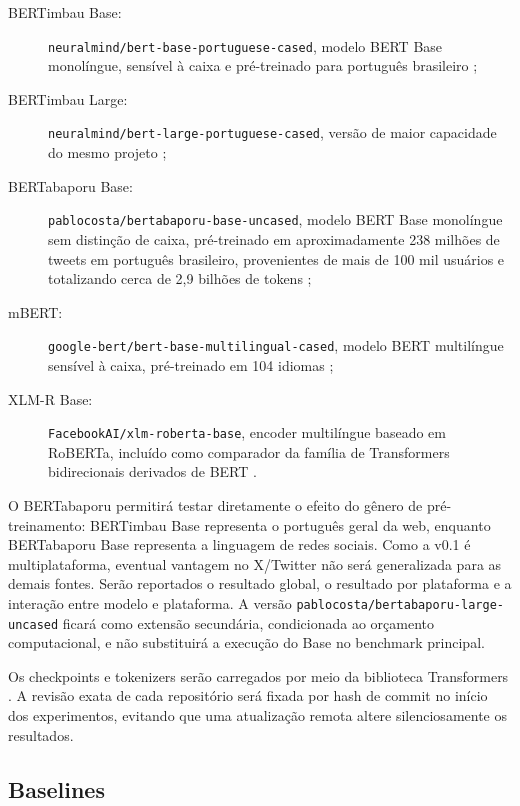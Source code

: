 \begin{description}
    \item[BERTimbau Base:] \texttt{neuralmind/bert-base-portuguese-cased},
    modelo BERT Base monolíngue, sensível à caixa e pré-treinado para português
    brasileiro \cite{souza2020bertimbau,neuralmind2026bertimbau};
    \item[BERTimbau Large:] \texttt{neuralmind/bert-large-portuguese-cased},
    versão de maior capacidade do mesmo projeto
    \cite{souza2020bertimbau,neuralmind2026bertimbau};
    \item[BERTabaporu Base:]
    \texttt{pablocosta/bertabaporu-base-uncased}, modelo BERT Base monolíngue
    sem distinção de caixa, pré-treinado em aproximadamente 238 milhões de
    tweets em português brasileiro, provenientes de mais de 100 mil usuários e
    totalizando cerca de 2,9 bilhões de tokens
    \cite{dacosta2023bertabaporu,dacosta2026bertabaporu};
    \item[mBERT:] \texttt{google-bert/bert-base-multilingual-cased}, modelo BERT
    multilíngue sensível à caixa, pré-treinado em 104 idiomas
    \cite{devlin2019bert,google2026mbert};
    \item[XLM-R Base:] \texttt{FacebookAI/xlm-roberta-base}, encoder
    multilíngue baseado em RoBERTa, incluído como comparador da família de
    Transformers bidirecionais derivados de BERT
    \cite{conneau2020xlmr,meta2026xlmr}.
\end{description}

O BERTabaporu permitirá testar diretamente o efeito do gênero de pré-treinamento:
BERTimbau Base representa o português geral da web, enquanto BERTabaporu Base
representa a linguagem de redes sociais. Como a v0.1 é multiplataforma, eventual
vantagem no X/Twitter não será generalizada para as demais fontes. Serão
reportados o resultado global, o resultado por plataforma e a interação entre
modelo e plataforma. A versão
\texttt{pablocosta/bertabaporu-large-uncased} ficará como extensão secundária,
condicionada ao orçamento computacional, e não substituirá a execução do Base
no benchmark principal.

Os checkpoints e tokenizers serão carregados por meio da biblioteca
Transformers \cite{wolf2020transformers}. A revisão exata de cada repositório
será fixada por hash de commit no início dos experimentos, evitando que uma
atualização remota altere silenciosamente os resultados.

\subsection{Baselines}

